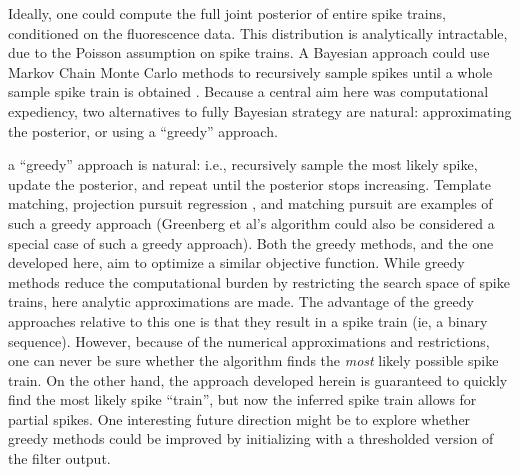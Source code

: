 Ideally, one could compute the full joint posterior of entire spike trains, conditioned on the fluorescence data.  This distribution is analytically intractable, due to the Poisson assumption on spike trains.  A Bayesian approach could use Markov Chain Monte Carlo methods to recursively sample spikes until a whole sample spike train is obtained \cite{AndrieuDoucet01,MishchenkoPaninski09}.  Because a central aim here was computational expediency, two alternatives to fully Bayesian strategy are natural: approximating the posterior, or using a ``greedy'' approach.  

a ``greedy'' approach is natural: i.e.,  recursively sample the most likely spike, update the posterior, and repeat until the posterior stops increasing.  Template matching, projection pursuit regression \cite{FS81}, and matching pursuit \cite{MallatZhang93} are examples of such a greedy approach (Greenberg et al's algorithm \cite{GreenbergKerr08} could also be considered a special case of such a greedy approach).  Both the greedy methods, and the one developed here, aim to optimize a similar objective function.  While greedy methods reduce the computational burden by restricting the search space of spike trains, here analytic approximations are made.  The advantage of the greedy approaches relative to this one is that they result in a spike train (ie, a binary sequence).  However, because of the numerical approximations and restrictions, one can never be sure whether the algorithm finds the \emph{most} likely possible spike train.  On the other hand, the approach developed herein is guaranteed to quickly find the most likely spike ``train'', but now the inferred spike train allows for partial spikes.  %
One interesting future direction might be to explore whether greedy methods could be improved by initializing with a thresholded version of the \foopsi filter output. 



